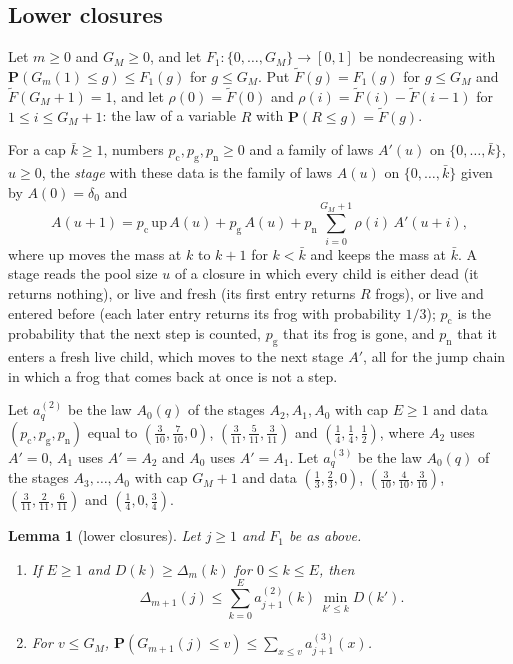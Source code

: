 \documentclass[11pt]{amsart}
\newtheorem{lemma}[theorem]{Lemma}
\theoremstyle{definition}
\numberwithin{equation}{section}
\newcommand{\lean}[1]{\ignorespaces}
\renewcommand{\P}{\mathbf{P}}
\begin{document}
\subsection*{Lower closures}
Let $m\ge0$ and $G_M\ge0$, and let $F_1:\{0,\dots,G_M\}\to[0,1]$ be nondecreasing with $\P(G_m(1)\le g)\le F_1(g)$ for $g\le G_M$. Put $\widetilde F(g)=F_1(g)$ for $g\le G_M$ and $\widetilde F(G_M+1)=1$, and let $\rho(0)=\widetilde F(0)$ and $\rho(i)=\widetilde F(i)-\widetilde F(i-1)$ for $1\le i\le G_M+1$: the law of a variable $R$ with $\P(R\le g)=\widetilde F(g)$.

For a cap $\bar k\ge1$, numbers $p_{\mathrm c},p_{\mathrm g},p_{\mathrm n}\ge0$ and a family of laws $A'(u)$ on $\{0,\dots,\bar k\}$, $u\ge0$, the \emph{stage} with these data is the family of laws $A(u)$ on $\{0,\dots,\bar k\}$ given by $A(0)=\delta_0$ and
\[
A(u+1)=p_{\mathrm c}\,\mathrm{up}\,A(u)+p_{\mathrm g}\,A(u)+p_{\mathrm n}\sum_{i=0}^{G_M+1}\rho(i)\,A'(u+i),
\]
where $\mathrm{up}$ moves the mass at $k$ to $k+1$ for $k<\bar k$ and keeps the mass at $\bar k$. A stage reads the pool size $u$ of a closure in which every child is either dead (it returns nothing), or live and fresh (its first entry returns $R$ frogs), or live and entered before (each later entry returns its frog with probability $1/3$); $p_{\mathrm c}$ is the probability that the next step is counted, $p_{\mathrm g}$ that its frog is gone, and $p_{\mathrm n}$ that it enters a fresh live child, which moves to the next stage $A'$, all for the jump chain in which a frog that comes back at once is not a step.

Let $a^{(2)}_q$ be the law $A_0(q)$ of the stages $A_2,A_1,A_0$ with cap $E\ge1$ and data $(p_{\mathrm c},p_{\mathrm g},p_{\mathrm n})$ equal to $(\frac3{10},\frac7{10},0)$, $(\frac3{11},\frac5{11},\frac3{11})$ and $(\frac14,\frac14,\frac12)$, where $A_2$ uses $A'=0$, $A_1$ uses $A'=A_2$ and $A_0$ uses $A'=A_1$. Let $a^{(3)}_q$ be the law $A_0(q)$ of the stages $A_3,\dots,A_0$ with cap $G_M+1$ and data $(\frac13,\frac23,0)$, $(\frac3{10},\frac4{10},\frac3{10})$, $(\frac3{11},\frac2{11},\frac6{11})$ and $(\frac14,0,\frac34)$.

\begin{lemma}[lower closures]\label{lem:lower}\lean{FrogModel.D3.Assembly.lemmaS2_proof, FrogModel.D3.Assembly.lemmaS3_proof, FrogModel.D3.Iface.lemmaS2, FrogModel.D3.Iface.lemmaS3, FrogModel.D3.Iface.lawS2, FrogModel.D3.Iface.lawS3, FrogModel.D3.Iface.stageLaw}
Let $j\ge1$ and $F_1$ be as above.
\begin{enumerate}
\item If $E\ge1$ and $D(k)\ge\Delta_m(k)$ for $0\le k\le E$, then
\[
\Delta_{m+1}(j)\le\sum_{k=0}^Ea^{(2)}_{j+1}(k)\,\min_{k'\le k}D(k').
\]
\item For $v\le G_M$, $\P(G_{m+1}(j)\le v)\le\sum_{x\le v}a^{(3)}_{j+1}(x)$.
\end{enumerate}
\end{lemma}
\end{document}
